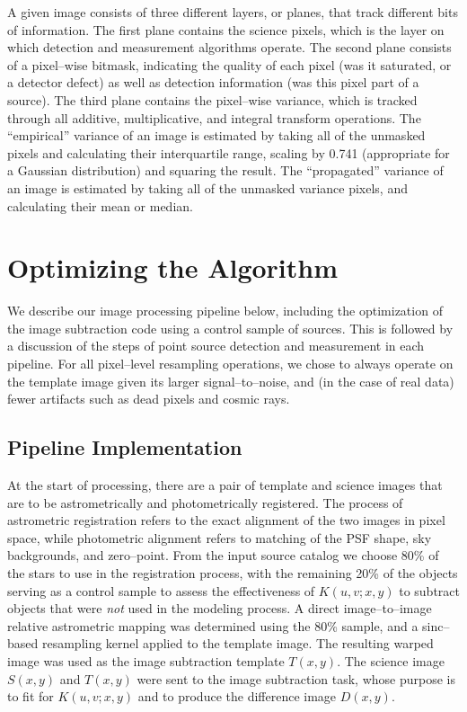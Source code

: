 \documentclass[iop]{emulateapj}
\begin{document}
A given image consists of three different layers, or planes, that track different bits of information.
The first plane contains the science pixels, which is the layer on which detection and measurement algorithms operate.
The second plane consists of a pixel--wise bitmask, indicating the quality of each pixel (was it saturated, or a detector defect) as well as detection information (was this pixel part of a source).
The third plane contains the pixel--wise variance, which is tracked through all additive, multiplicative, and integral transform operations.
The ``empirical'' variance of an image is estimated by taking all of the unmasked pixels and calculating their interquartile range, scaling by 0.741 (appropriate for a Gaussian distribution) and squaring the result.
The ``propagated'' variance of an image is estimated by taking all of the unmasked variance pixels, and calculating their mean or median.

\section{Optimizing the Algorithm}

We describe our image processing pipeline below, including the optimization of the image subtraction code using a control sample of sources.
This is followed by a discussion of the steps of point source detection and measurement in each pipeline.
For all pixel--level resampling operations, we chose to always operate on the template image given its larger signal--to--noise, and (in the case of real data) fewer artifacts such as dead pixels and cosmic rays.

\subsection{Pipeline Implementation}

At the start of processing, there are a pair of template and science images that are to be astrometrically and photometrically registered.
The process of astrometric registration refers to the exact alignment of the two images in pixel space, while photometric alignment refers to matching of the PSF shape, sky backgrounds, and zero--point.
From the input source catalog we choose 80\% of the stars to use in the registration process, with the remaining 20\% of the objects serving as a control sample to assess the effectiveness of $K(u,v;x,y)$ to subtract objects that were {\it not} used in the modeling process.
A direct image--to--image relative astrometric mapping was determined using the 80\% sample, and a sinc--based resampling kernel applied to the template image.
The resulting warped image was used as the image subtraction template $T(x,y)$.
The science image $S(x,y)$ and $T(x,y)$ were sent to the image subtraction task, whose purpose is to fit for $K(u,v;x,y)$ and to produce the difference image $D(x,y)$.
\end{document}
